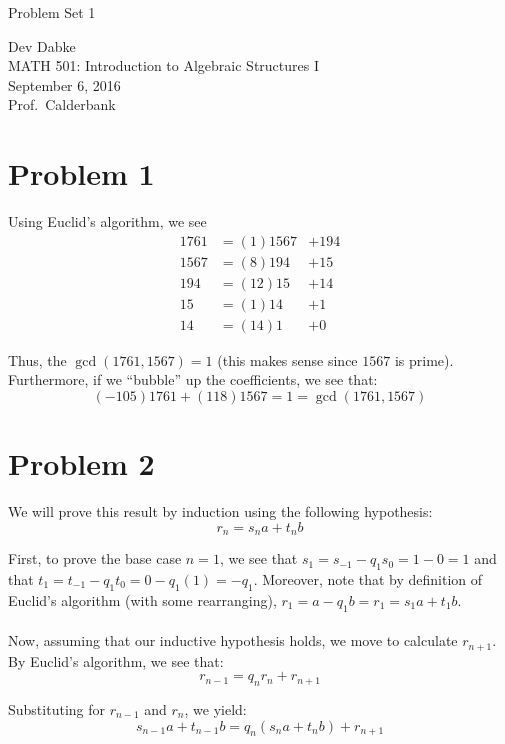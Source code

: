 \documentclass[letterpaper]{article}
\def\name{Problem Set 1}
\begin{document}
{\huge \name}


\vspace{0.25in}

Dev Dabke \\
MATH 501: Introduction to Algebraic Structures I \\
September 6, 2016 \\
Prof.\ Calderbank \\

\section{Problem 1}
\label{sec:Problem1}

Using Euclid's algorithm, we see
\begin{align}
    1761 & = (1) 1567 & + 194 \\
    1567 & = (8) 194 & + 15 \\
    194 & = (12) 15 & + 14 \\
    15 & = (1) 14 & + 1 \\
    14 & = (14) 1 & + 0
\end{align}

Thus, the $ \gcd(1761, 1567) = 1 $ (this makes sense since $ 1567 $ is prime).
Furthermore, if we ``bubble'' up the coefficients, we see that:
$$ (-105) 1761 + (118) 1567 = 1 = \gcd(1761, 1567) $$

\section{Problem 2}
\label{sec:Problem2}

We will prove this result by induction using the following hypothesis:
$$ r_n = s_n a + t_n b $$

First, to prove the base case $ n = 1 $, we see that $ s_1 = s_{-1} - q_1 s_0 = 1 - 0 = 1 $ and that $ t_1 = t_{-1} - q_1 t_{0} = 0 - q_1(1) = -q_1 $.
Moreover, note that by definition of Euclid's algorithm (with some rearranging), $ r_1 = a - q_1 b = r_1 = s_1 a + t_1 b $.
\\ \\
Now, assuming that our inductive hypothesis holds, we move to calculate $ r_{n + 1} $. By Euclid's algorithm, we see that:
$$ r_{n - 1} = q_n r_n + r_{n + 1} $$

Substituting for $ r_{n - 1} $ and $ r_n $, we yield:
$$ s_{n - 1} a + t_{n - 1}b = q_n (s_n a + t_n b) + r_{n + 1} $$
\end{document}
